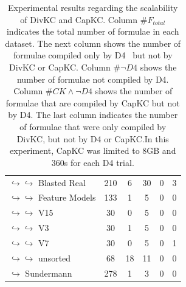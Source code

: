 \documentclass{article}
\newcommand\dfour[0]{D4\xspace}
\newcommand\divkc[0]{DivKC\xspace}
\newcommand\capkc[0]{CapKC\xspace}
\begin{document}
\begin{table}[h!]
\begin{tabular}{l|c|c|c|c|c}
$\hookrightarrow \hookrightarrow$ Blasted Real & 210 & 6 & 30 & 0 & 3 \\
$\hookrightarrow \hookrightarrow$ Feature Models & 133 & 1 & 5 & 0 & 0 \\
$\hookrightarrow \hookrightarrow$ V15 & 30 & 0 & 5 & 0 & 0 \\
$\hookrightarrow \hookrightarrow$ V3 & 30 & 1 & 5 & 0 & 0 \\
$\hookrightarrow \hookrightarrow$ V7 & 30 & 0 & 5 & 0 & 1 \\
$\hookrightarrow \hookrightarrow$ unsorted & 68 & 18 & 11 & 0 & 0 \\
$\hookrightarrow$ Sundermann \cite{SBK+:SPLC24} & 278 & 1 & 3 & 0 & 0 \\
    \end{tabular}
            \caption{Experimental results regarding the scalability of \divkc and \capkc.
            Column \#$F_\textit{total}$ indicates the total number of formulae in each dataset.
            The next column shows the number of formulae compiled only by \dfour~\cite{D4} but not by \divkc or \capkc.
            Column \#$\neg\textit{\dfour}$ shows the number of formulae not compiled by \dfour.
            Column \#$\textit{CK} \land \neg \textit{\dfour}$ shows the number of formulae that are compiled by \capkc but not by \dfour.
            The last column indicates the number of formulae that were only compiled by \divkc, but not by \dfour or \capkc.In this experiment, \capkc was limited to 8GB and 360s for each \dfour trial.
        }
        \label{divkc:tab:gen}
    \end{table}
\end{document}
